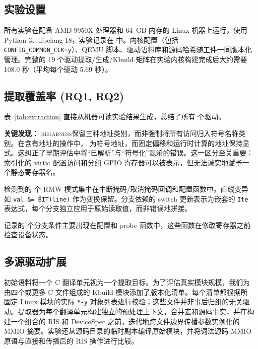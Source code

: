 \documentclass[sigplan, screen, review, anonymous]{acmart}
\newcommand{\reharness}{\textsc{reharness}}
\begin{document}
\subsection{实验设置}

所有实验在配备 AMD 9950X 处理器和 64~GB 内存的 Linux 机器上运行，使用 Python 3、libclang 18，实验记录在  中。内核配置（包括 \texttt{CONFIG\_COMMON\_CLK=y}）、QEMU 脚本、驱动语料库和源码哈希随工件一同版本化管理。完整的 19 个驱动提取/生成/Kbuild 矩阵在实验内核构建完成后大约需要 108.0 秒（平均每个驱动 5.69 秒）。

\subsection{提取覆盖率 (RQ1, RQ2)}

表~\ref{tab:extraction} 直接从机器可读实验结果生成，总结了所有 \EvalDrivers{} 个驱动。

\begin{table}[t]
\centering
\caption{\EvalDrivers{} 个测试驱动的提取统计。Sym、Fixed 和 Comp 是不同的地址类别。}
\label{tab:extraction}
\resizebox{\columnwidth}{!}{\ExtractionResultsTable}
\end{table}

\textbf{关键发现：} \reharness 保留三种地址类别，而非强制将所有访问归入符号名称类别。在含有地址的操作中，\EvalSymbolicPct{} 为符号地址，而固定偏移和运行时计算的地址保持显式。这纠正了早期评估中将``已解析''与``符号化''混淆的错误。这一区分至关重要：索引化的 virtio 配置访问和分组 GPIO 寄存器可以被表示，但无法诚实地赋予一个静态寄存器名。

检测到的 \EvalRMW{} 个 RMW 模式集中在中断掩码/取消掩码回调和配置函数中。直线变异如 \texttt{val \&= \~BIT(line)} 作为变换保留。分支依赖的 switch 更新表示为嵌套的 \texttt{Ite} 表达式，每个分支独立应用于原始读取值，而非错误地拼接。

记录的 \EvalConditions{} 个分支条件主要出现在配置和 probe 函数中，这些函数在修改寄存器之前检查设备状态。

\subsection{多源驱动扩展}

初始语料将一个 C 翻译单元视为一个提取目标。为了评估真实模块规模，我们为由四个或更多 C 文件组成的 Kbuild 模块添加了版本化清单。每个清单都根据所固定 Linux 模块的实际 \texttt{*-y} 对象列表进行校验；这些文件并非事后归组的无关驱动。提取器为每个翻译单元构建独立的预处理上下文，合并宏和源码事实，并在构建一个组合的 RIS 和 DeviceSpec 之前，迭代地跨文件边界传播参数实例化的 MMIO 摘要。实验还从源码目录的临时副本编译原始模块，并将词法源码 MMIO 原语与直接和传播后的 RIS 操作进行比较。
\end{document}
